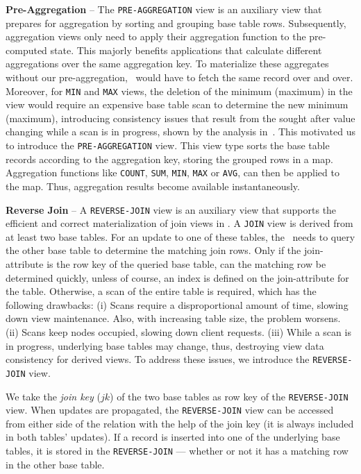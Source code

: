 \noindent  
\textbf{Pre-Aggregation} -- The \texttt{PRE-AGGREGATION} view is an
auxiliary view that prepares for aggregation by sorting and grouping
base table rows. Subsequently, aggregation views only need to apply
their aggregation function to the pre-computed state. This majorly
benefits applications that calculate different aggregations over the
same aggregation key.
%
%
To materialize these aggregates without our pre-aggregation,
\VMS\ would have to fetch the same record over and over. Moreover, for
\texttt{MIN} and \texttt{MAX} views, the deletion of the minimum
(maximum) in the view would require an expensive base table scan to
determine the new minimum (maximum), introducing consistency issues
that result from the sought after value changing while a scan is in
progress, shown by the analysis in~\cite{jacobsen:viewmaintenance}.
This motivated us to introduce the \texttt{PRE-AGGREGATION} view. This
view type sorts the base table records according to the aggregation
key, storing the grouped rows in a map. Aggregation functions like
\texttt{COUNT}, \texttt{SUM}, \texttt{MIN}, \texttt{MAX} or
\texttt{AVG}, can then be applied to the map. Thus, aggregation
results become available instantaneously.

\noindent  
\textbf{Reverse Join} -- A \texttt{REVERSE-JOIN} view is an
auxiliary view that supports the efficient and correct materialization
of join views in \VMS.  A \texttt{JOIN} view is derived from at least two
base tables. For an update to one of these tables, the \VM\ needs to
query the other base table to determine the matching join rows. Only
if the join-attribute is the row key of the queried base table, can
the matching row be determined quickly, unless of course, an index is
defined on the join-attribute for the table.  Otherwise, a scan of the
entire table is required, which has the following drawbacks: (i) Scans
require a disproportional amount of time, slowing down view
maintenance. Also, with increasing table size, the problem worsens. (ii)
Scans keep nodes occupied, slowing down client requests.  (iii)
While a scan is in progress, underlying base tables may change, thus,
destroying view data consistency for derived views. To address these 
issues, we introduce the \texttt{REVERSE-JOIN} view.

We take the \textit{join key} ($jk$) of the two base tables as row key
of the \texttt{REVERSE-JOIN} view. When updates are propagated, the
\texttt{REVERSE-JOIN} view can be accessed from either side of the
relation with the help of the join key (it is always included in both
tables' updates). If a record is inserted into one of the underlying
base tables, it is stored in the \texttt{REVERSE-JOIN} --- whether or
not it has a matching row in the other base table.


